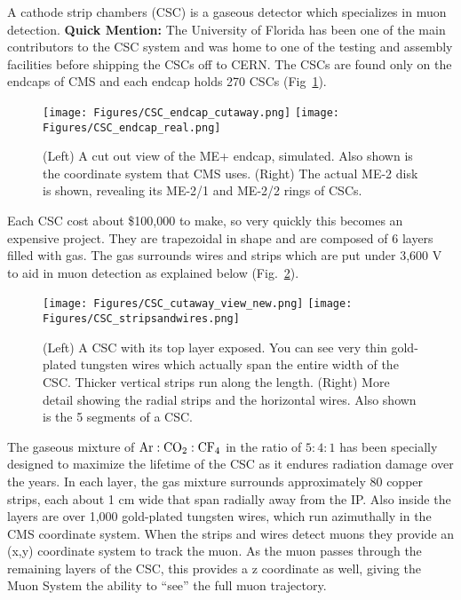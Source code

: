 A cathode strip chambers (CSC) is a gaseous detector which specializes in muon detection. 
{\bf Quick Mention:} The University of Florida has been one of the main contributors to the CSC system and was home to one of the testing and assembly facilities before shipping the CSCs off to CERN.
The CSCs are found only on the endcaps of CMS and each endcap holds 270 CSCs (Fig~\ref{fig:CMS_endcap}). 
\begin{figure}[pbth]
\centering
\texttt{[image: Figures/CSC\_endcap\_cutaway.png]}
\texttt{[image: Figures/CSC\_endcap\_real.png]}
    \caption{
    (Left) A cut out view of the ME+ endcap, simulated. Also shown is the coordinate system that CMS uses.
    (Right) The actual ME-2 disk is shown, revealing its ME-2/1 and ME-2/2 rings of CSCs.
    }
    \label{fig:CMS_endcap}
\end{figure}
Each CSC cost about \$100,000 to make, so very quickly this becomes an expensive project.
They are trapezoidal in shape and are composed of 6 layers filled with gas.
The gas surrounds wires and strips which are put under 3,600 V to aid in muon detection as explained below (Fig.~\ref{fig:CSC_guts}). 
\begin{figure}[pbth]
\centering
\texttt{[image: Figures/CSC\_cutaway\_view\_new.png]}
\texttt{[image: Figures/CSC\_stripsandwires.png]}
    \caption{
    (Left) A CSC with its top layer exposed. You can see very thin gold-plated tungsten wires which actually span the entire width of the CSC. 
    Thicker vertical strips run along the length.
    (Right) More detail showing the radial strips and the horizontal wires. Also shown is the 5 segments of a CSC.
    }
    \label{fig:CSC_guts}
\end{figure}
The gaseous mixture of ${\rm Ar:CO_{2}:CF_{4} }$ in the ratio of $5:4:1$ has been specially designed to maximize the lifetime of the CSC as it endures radiation damage over the years. 
In each layer, the gas mixture surrounds approximately 80 copper strips, each about 1 cm wide that span radially away from the IP.
Also inside the layers are over 1,000 gold-plated tungsten wires, which run azimuthally in the CMS coordinate system.
When the strips and wires detect muons they provide an (x,y) coordinate system to track the muon. 
As the muon passes through the remaining layers of the CSC, this provides a z coordinate as well, giving the Muon System the ability to ``see'' the full muon trajectory.

